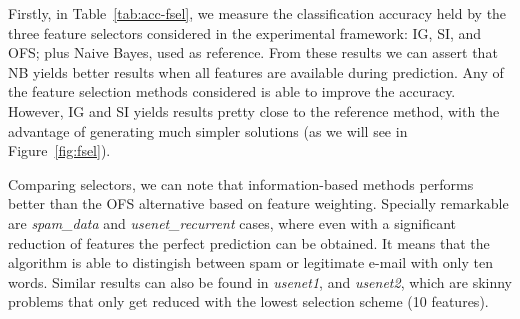 \documentclass[preprint,12pt]{elsarticle}
\begin{document}
Firstly, in Table~\ref{tab:acc-fsel}, we measure the classification accuracy held by the three feature selectors considered in the experimental framework: IG, SI, and OFS; plus Naive Bayes, used as reference. From these results we can assert that NB yields better results when all features are available during prediction. Any of the feature selection methods considered is able to improve the accuracy. However, IG and SI yields results pretty close to the reference method, with the advantage of generating much simpler solutions (as we will see in Figure~\ref{fig:fsel}). 

Comparing selectors, we can note that information-based methods performs better than the OFS alternative based on feature weighting. Specially remarkable are \textit{spam\_data} and \textit{usenet\_recurrent} cases, where even with a significant reduction of features the perfect prediction can be obtained. It means that the algorithm is able to distingish between spam or legitimate e-mail with only ten words. Similar results can also be found in \textit{usenet1}, and \textit{usenet2}, which are skinny problems that only get reduced with the lowest selection scheme (10 features).  
\end{document}
